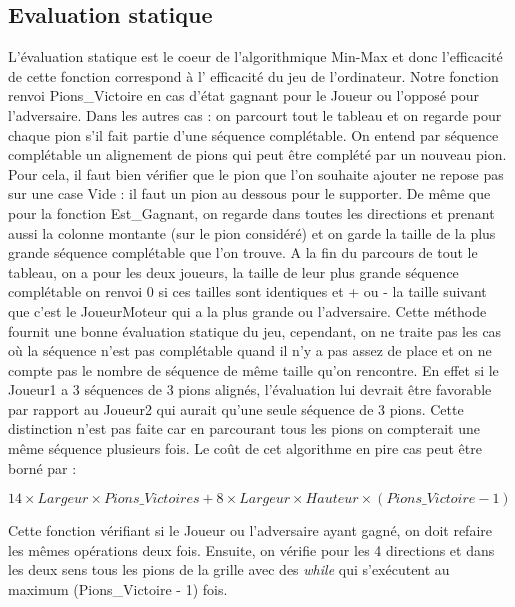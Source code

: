 \documentclass[a4paper, 10pt, french]{article}
\begin{document}
{    \subsection{Evaluation statique}
    {
        L'évaluation statique est le coeur de l'algorithmique Min-Max et donc l'efficacité de cette fonction correspond à l'
        efficacité du jeu de l'ordinateur. Notre fonction renvoi Pions\_Victoire en cas d'état gagnant pour le Joueur ou
        l'opposé pour l'adversaire.
        Dans les autres cas : on parcourt tout le tableau et on regarde pour chaque pion s'il fait partie d'une séquence
        complétable. On entend par séquence complétable un alignement de pions qui peut être complété par un nouveau pion.
        Pour cela, il faut bien vérifier que le pion que l'on souhaite ajouter ne repose pas sur une case Vide : il faut un pion au
        dessous pour le supporter.
        De même que pour la fonction Est\_Gagnant, on regarde dans toutes les directions et prenant aussi la colonne montante (sur
        le pion considéré) et on garde la taille de la plus grande séquence complétable que l'on trouve.
        A la fin du parcours de tout le tableau, on a pour les deux joueurs, la taille de leur plus grande séquence complétable
        on renvoi 0 si ces tailles sont identiques et + ou - la taille suivant que c'est le JoueurMoteur qui a la plus grande
        ou l'adversaire.
        Cette méthode fournit une bonne évaluation statique du jeu, cependant, on ne traite pas les cas où la séquence n'est pas
        complétable quand il n'y a pas assez de place et on ne compte pas le nombre de séquence de même taille qu'on rencontre.
        En effet si le Joueur1 a 3 séquences de 3 pions alignés, l'évaluation lui devrait être favorable par rapport au Joueur2
        qui aurait qu'une seule séquence de 3 pions. Cette distinction n'est pas faite car en parcourant tous les pions on
        compterait une même séquence plusieurs fois.
        Le coût de cet algorithme en pire cas peut être borné par :
        \begin{center}
            $14 \times Largeur \times Pions\_Victoires + 8 \times Largeur \times Hauteur \times (Pions\_Victoire - 1)$
        \end{center}
        Cette fonction vérifiant si le Joueur ou l'adversaire ayant gagné, on doit refaire les mêmes opérations deux fois.
        Ensuite, on vérifie pour les 4 directions et dans les deux sens tous les pions de la grille avec des {\em while} qui
        s'exécutent au maximum (Pions\_Victoire - 1) fois.
    }

}
\end{document}
